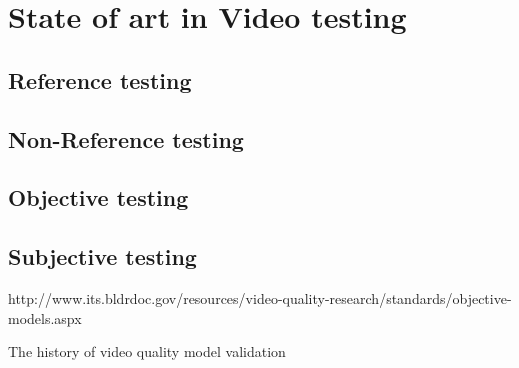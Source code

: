 
\section{State of art in Video testing}
\subsection{Reference testing}

\subsection{Non-Reference testing}

\subsection{Objective testing}

\subsection{Subjective testing}
http://www.its.bldrdoc.gov/resources/video-quality-research/standards/objective-models.aspx


The history of video quality model validation \cite{6659332}
